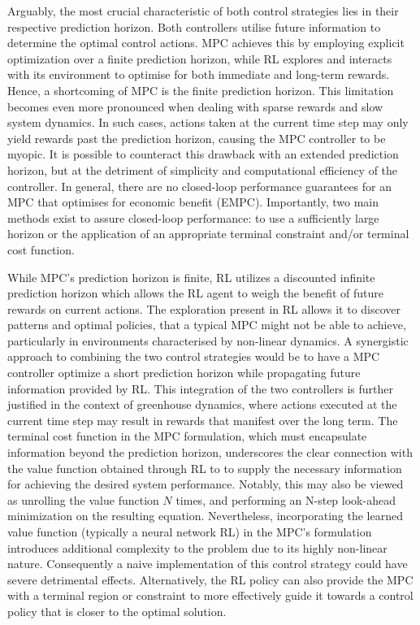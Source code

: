 Arguably, the most crucial characteristic of both control strategies lies in their respective prediction horizon. Both controllers utilise future information to determine the optimal control actions. MPC achieves this by employing explicit optimization over a finite prediction horizon, while RL explores and interacts with its environment to optimise for both immediate and long-term rewards.
Hence, a shortcoming of MPC is the finite prediction horizon. This limitation becomes even more pronounced when dealing with sparse rewards and slow system dynamics. In such cases, actions taken at the current time step may only yield rewards past the prediction horizon, causing the MPC controller to be myopic. It is possible to counteract this drawback with an extended prediction horizon, but at the detriment of simplicity and computational efficiency of the controller. In general, there are no closed-loop performance guarantees for an MPC that optimises for economic benefit (EMPC). Importantly, two main methods exist to assure closed-loop performance: to use a sufficiently large horizon or the application of an appropriate terminal constraint and/or terminal cost function.

While MPC's prediction horizon is finite, RL utilizes a discounted infinite prediction horizon which allows the RL agent to weigh the benefit of future rewards on current actions. The exploration present in RL allows it to discover patterns and optimal policies, that a typical MPC might not be able to achieve, particularly in environments characterised by non-linear dynamics. A synergistic approach to combining the two control strategies would be to have a MPC controller optimize a short prediction horizon while propagating future information provided by RL. This integration of the two controllers is further justified in the context of greenhouse dynamics, where actions executed at the current time step may result in rewards that manifest over the long term. The terminal  cost function in the MPC formulation, which must encapsulate information beyond the prediction horizon, underscores the clear connection with the value function obtained through RL to to supply the necessary information for achieving the desired system performance. Notably, this may also be viewed as unrolling the value function $N$ times, and performing an N-step look-ahead minimization on the resulting equation. Nevertheless, incorporating the learned value function (typically a neural network RL) in the MPC's formulation introduces additional complexity to the problem due to its highly non-linear nature. Consequently a naive implementation of this control strategy could have severe detrimental effects. Alternatively, the RL policy can also provide the MPC with a terminal region or constraint to more effectively guide it towards a control policy that is closer to the optimal solution.

